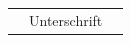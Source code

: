 \documentclass[12pt,twoside]{scrreport}
\begin{document}
\vspace{2cm}
\begin{flushright}
	\renewcommand{\arraystretch}{1.3}
	\begin{tabular}{ccc}
		\hline
		\hspace*{2cm}&Unterschrift&\hspace*{2cm}\\
	\end{tabular}
\end{flushright}


\end{document}

